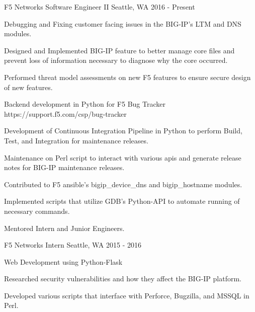 

\begin{cventries}

  \cventry
    {F5 Networks} %
    {Software Engineer II} %
    {Seattle, WA} %
    {2016 - Present} %
    {
      \begin{cvitems} %
        \item {Debugging and Fixing customer facing issues in the BIG-IP's LTM and DNS modules.}
        \item {Designed and Implemented BIG-IP feature to better manage core files and prevent loss of information necessary to diagnose why the core occurred.}
        \item {Performed threat model assessments on new F5 features to ensure secure design of new features.}
        \item {Backend development in Python for F5 Bug Tracker https://support.f5.com/csp/bug-tracker}
        \item {Development of Continuous Integration Pipeline in Python to perform Build, Test, and Integration for maintenance releases.}
        \item {Maintenance on Perl script to interact with various apis and generate release notes for BIG-IP maintenance releases.}
        \item {Contributed to F5 ansible's bigip\_device\_dns and bigip\_hostname modules.}
        \item {Implemented scripts that utilize GDB's Python-API to automate running of necessary commands.}
        \item {Mentored Intern and Junior Engineers.}
      \end{cvitems}
    }

  \cventry
    {F5 Networks} %
    {Intern} %
    {Seattle, WA} %
    {2015 - 2016} %
    {
      \begin{cvitems} %
        \item {Web Development using Python-Flask}
        \item {Researched security vulnerabilities and how they affect the BIG-IP platform.}
        \item {Developed various scripts that interface with Perforce, Bugzilla, and MSSQL in Perl.}
      \end{cvitems}
    }


\end{cventries}
